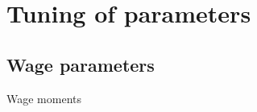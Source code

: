 \section{Tuning of parameters}

\subsection{Wage parameters}

\begin{table}[ht]
    \centering
    
    \caption{Wage moments}
    \label{tab:my_label}
\end{table}

